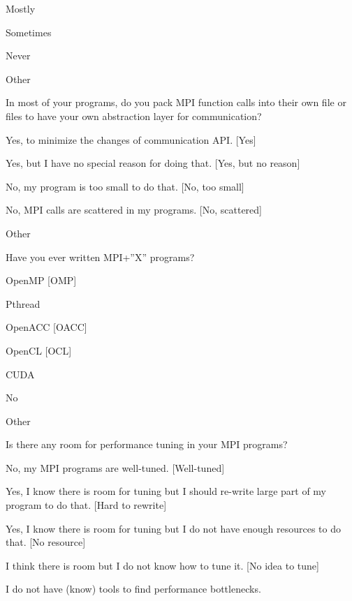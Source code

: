 \documentclass[preprint,5p,times]{elsarticle}
\begin{document}
{\begin{description}
\begin{inparaenum}[{\bf C}1)]
    \item Mostly
    \item Sometimes
    \item Never
    \item Other
    \end{inparaenum}
  \item[Q21:] In most of your programs, do you pack MPI function calls into their own file or files to have your own abstraction layer for communication?
    \begin{inparaenum}[{\bf C}1)]
    \item Yes, to minimize the changes of communication API. [Yes]
    \item Yes, but I have no special reason for doing that. [Yes, but no reason]
    \item No, my program is too small to do that. [No, too small]
    \item No, MPI calls are scattered in my programs. [No, scattered]
    \item Other
    \end{inparaenum}
  \item[Q22*:] Have you ever written MPI+”X” programs?
    \begin{inparaenum}[{\bf C}1)]
    \item OpenMP [OMP]
    \item Pthread
    \item OpenACC [OACC]
    \item OpenCL [OCL]
    \item CUDA
    \item No
    \item Other
    \end{inparaenum}
  \item[Q23:] Is there any room for performance tuning in your MPI programs?
    \begin{inparaenum}[{\bf C}1)]
    \item No, my MPI programs are well-tuned. [Well-tuned]
    \item Yes, I know there is room for tuning but I should re-write large
      part of my program to do that. [Hard to rewrite]
    \item Yes, I know there is room for tuning but I do not have enough resources to do that.
      [No resource]
    \item I think there is room but I do not know how to tune it.
      [No idea to tune]
    \item I do not have (know) tools to find performance bottlenecks.

\end{inparaenum}
\end{description}}
\end{document}
